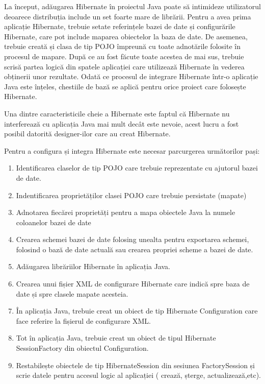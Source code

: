 \documentclass[12pt]{book}
\begin{document}
La început, adăugarea Hibernate în proiectul Java poate să intimideze utilizatorul deoarece distribuția include un set foarte mare de librării. Pentru a avea prima aplicație Hibernate, trebuie setate referințele bazei de date și configurările Hibernate, care pot include maparea obiectelor la baza de date. De asemenea, trebuie creată și clasa de tip POJO împreună cu toate adnotările folosite în procesul de mapare. După ce au fost făcute toate acestea de mai sus, trebuie scrisă partea logică din spatele aplicației care utilizează Hibernate în vederea obținerii unor rezultate. Odată ce procesul de integrare Hibernate într-o aplicație Java este înțeles, chestiile de bază se aplică pentru orice proiect care folosește Hibernate.

Una dintre caracteristicile cheie a Hibernate este faptul că Hibernate nu interferează cu aplicația Java mai mult decât este nevoie, acest lucru a fost posibil datorită designer-ilor care au creat Hibernate. 

Pentru a configura și integra Hibernate este necesar parcurgerea următorilor pași:
\begin{addmargin}[4em]{1em}
	\begin{enumerate}
	\item Identificarea claselor de tip POJO care trebuie reprezentate cu ajutorul bazei de date.
	\item Indentificarea proprietăților clasei POJO care trebuie persistate (mapate)
	\item Adnotarea fiecărei proprietăți pentru a mapa obiectele Java la numele coloanelor bazei de date
	\item Crearea schemei bazei de date folosing unealta pentru exportarea schemei, folosind o bază de date actuală sau crearea propriei scheme a bazei de date.
	\item Adăugarea librăriilor Hibernate în aplicația Java.
	\item Crearea unui fișier XML de configurare Hibernate care indică spre baza de date și spre clasele mapate acesteia.
	\item În aplicația Java, trebuie creat un obiect de tip Hibernate Configuration care face referire la fișierul de configurare XML.
	\item Tot în aplicația Java, trebuie creat un obiect de tipul Hibernate SessionFactory din obiectul Configuration.
	\item Restabilește obiectele de tip HibernateSession din sesiunea FactorySession și scrie datele pentru accesul logic al aplicației ( crează, șterge, actualizează,etc).\cite{BeginningHibernate}
\end{enumerate}
\end{addmargin}
\end{document}
